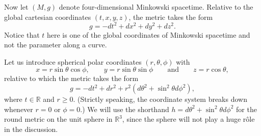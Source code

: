 \documentclass[10pt,a4paper]{exam}
\newcommand{\sttl}[1]{{\color{darkblue}\sffamily\bfseries #1}}
\newcommand{\doit}[1]{{\color{darkgreen}\sffamily\bfseries #1}}
\newcommand{\RR}{\mathbb{R}}
\begin{document}
\begin{questions}
\question Now let $(M, g)$ denote four-dimensional Minkowski
  spacetime.  Relative to the global cartesian coordinates
  $(t,x,y,z)$, the metric takes the form
  \begin{equation*}
    g = -dt^2 + dx^2 + dy^2 + dz^2.
  \end{equation*}
  Notice that $t$ here is one of the global coordinates of Minkowski
  spacetime and not the parameter along a curve.
  
  Let us introduce spherical polar coordinates $(r,\theta,\phi)$ with
  \begin{equation*}
      x = r \sin\theta\cos\phi, \qquad y = r \sin\theta\sin\phi \qquad\text{and}\qquad  z = r \cos\theta,
  \end{equation*}
  relative to which the metric takes the form
  \begin{equation}\label{eq:mink-polar}
    g = -dt^2 + dr^2 + r^2 (d\theta^2 + \sin^2\theta d\phi^2),
  \end{equation}
  where $t \in \RR$ and $r\geq 0$.  (Strictly speaking,
  the coordinate system breaks down whenever $r=0$ or $\phi = 0$.)  We will use the
  shorthand $h = d\theta^2 + \sin^2\theta d\phi^2$ for the round
  metric on the unit sphere in $\RR^3$, since the sphere will not play
  a huge rôle in the discussion.

\end{questions}
\end{document}
